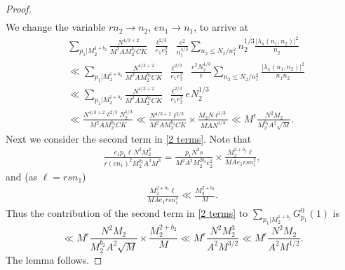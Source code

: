 \documentclass[12pt,a4paper,twoside, reqno]{amsart}
\begin{document}
\begin{proof}
\begin{align}
\end{align}
We change the variable $rn_2 \rightarrow n_2$, $en_1 \rightarrow n_1$,  to arrive at 
\begin{align}
       & \sum_{p_1| M_2^{1+b_2}} \frac{N^{4/3+2}  }{M^2 AM_2^{b_2} C K}\mathop{\sum_{\substack {e_1e_2 \ll N_1 \\ e_1\mid M_2^{1+b_2} }   }}  \frac{\ell^{2/3}}{e_1e_2^2 }  \mathop{\sum_{ \substack{n_1rs= \ell \\ (n_1s,p_1d)=1 \\ r | (p_1d)^\infty \\ e|n_1 \asymp N_1  }}}     \frac{  e^{2}}{ n_1^{4/3} }   \sum_{n_2 \leq N_2/n_1^2} n_2^{1/3}\frac{ { |\lambda_\pi(n_1,n_2)|^2 }}{ { n_2^{}}  }  \\
        & \ll  \sum_{p_1| M_2^{1+b_2}} \frac{N^{4/3+2}  }{M^2 AM_2^{b_2} C K}\mathop{\sum_{\substack {e_1e_2 \ll N_1 \\ e_1\mid M_2^{1+b_2} }   }}  \frac{\ell^{2/3}}{e_1e_2^2 }  \mathop{\sum_{ \substack{n_1rs= \ell \\ (n_1s,p_1d)=1 \\ r | (p_1d)^\infty \\ e|n_1 \asymp N_1  }}}    \frac{  e^{2}N_2^{1/3} }{ e^{} }   \sum_{n_2 \leq N_2/n_1^2}\frac{ { |\lambda_\pi(n_1,n_2)|^2 }}{ { n_1n_2^{}}  }  \\
          & \ll  \sum_{p_1| M_2^{1+b_2}} \frac{N^{4/3+2}  }{M^2 AM_2^{b_2} C K}\mathop{\sum_{\substack {e_1e_2 \ll N_1 \\ e_1\mid M_2^{1+b_2} }   }}  \frac{\ell^{2/3}}{e_1e_2^2 }     {  e^{}N_2^{1/3} }{  }  \\
           & \ll \frac{N^{4/3+2}\ell^{2/3}N_2^{1/3}  }{M^2 AM_2^{b_2} C K} \ll \frac{N^{4/3+2}\ell^{2/3} }{M^2 AM_2^{b_2} C K} \times \frac{M_2 N \ell^{1/3}}{MAN^{1/3}} \ll  M^\epsilon \frac{N^2  M_2}{M_2^{b_2} A^2 \sqrt{M}}.
\end{align}
Next we consider the second term in \eqref{2 terms}.
Note that 
\begin{align*}
      \frac{ e_1  p_1 \ell^{} N^2M_2^{2}} { r(en_1)^{2} M_2^{b_2}A^3 M^3 {}} {  }{ } =  \frac{p_1N^2s}{M^2 A^2M_2^{2b_2}e_2^2} \times \frac{M_2^{2+b_2} \ell }{MAe_1 rs n_1^2  },
\end{align*}
and (as $\ell=rsn_1$)
\begin{align*}
      \frac{M_2^{2+b_2} \ell }{MAe_1 rs n_1^2  } \ll       \frac{M_2^{2+b_2}  }{M   }.
\end{align*}
Thus the contribution of the second term in \eqref{2 terms} to 
 $ \sum_{p_1| M_2^{1+b_2}} G_{p_1}^0(1)$ is 
 \[\ll  M^\epsilon \frac{N^2  M_2}{M_2^{b_2} A^2 \sqrt{M}} \times \frac{M_2^{2+b_2}  }{M   }\ll M^\epsilon \frac{N^2  M_2^3}{ A^2 {M^{3/2}}}  \ll  M^\epsilon \frac{N^2  M_2}{ A^2 {M^{1/2}}}.  \]
 The lemma follows. 
 \end{proof}
\end{document}
